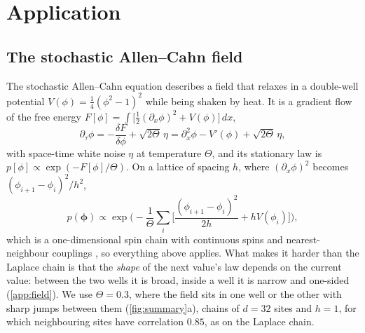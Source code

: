 \documentclass{article}
\begin{document}
\section{Application}
\label{sec:applications}

\subsection{The stochastic Allen--Cahn field}
\label{sec:allen-cahn}

The stochastic Allen--Cahn equation \cite{allen1979microscopic,dapratozabczyk2014} describes a field that relaxes in a
double-well potential $V(\phi)=\tfrac14(\phi^2-1)^2$ while being shaken by heat. It is a gradient flow of the free
energy $F[\phi]=\int\big[\tfrac12(\partial_x\phi)^2+V(\phi)\big]\,dx$,
\begin{equation}
  \partial_\tau\phi=-\frac{\delta F}{\delta\phi}+\sqrt{2\Theta}\,\eta
  =\partial_x^2\phi-V'(\phi)+\sqrt{2\Theta}\,\eta,
\end{equation}
with space-time white noise $\eta$ at temperature $\Theta$, and its stationary law is $p[\phi]\propto\exp(-F[\phi]/\Theta)$.
On a lattice of spacing $h$, where $(\partial_x\phi)^2$ becomes $(\phi_{i+1}-\phi_i)^2/h^2$,
\begin{equation}
  p(\boldsymbol\phi)\propto\exp\Big(-\frac1\Theta\sum_i\Big[\frac{(\phi_{i+1}-\phi_i)^2}{2h}+hV(\phi_i)\Big]\Big),
\end{equation}
which is a one-dimensional spin chain with continuous spins and nearest-neighbour couplings
\cite{achilli2026speciation}, so everything above applies. What makes it harder than the Laplace chain is that the
\emph{shape} of the next value's law depends on the current value: between the two wells it is broad, inside a well it
is narrow and one-sided (\cref{app:field}). We use $\Theta=0.3$, where the field sits in one well or the other with sharp
jumps between them (\cref{fig:summary}a), chains of $d=32$ sites and $h=1$, for which neighbouring sites have
correlation $0.85$, as on the Laplace chain.
\end{document}
